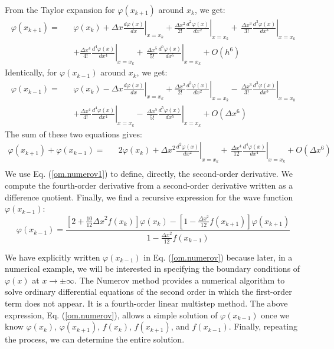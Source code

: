 \documentclass[nofootinbib, secnumarabic, amsmath, nobibnotes,11pt,aps,pra, floatfix]{revtex4-1}
\newcommand{\eref}[1]{Eq. (\ref{#1})}
\begin{document}
From the Taylor expansion for $\varphi(x_{k + 1})$ around $x_k$, we get:
\begin{eqnarray}
\varphi(x_{k + 1}) =&& \varphi(x_{k}) + \Delta x \left.\frac {d\varphi(x)}{dx}\right|_{x = x_k} + \frac{\Delta x^2}{2!} \left.\frac {d^2\varphi(x)}{dx^2}\right|_{x = x_k} +\, \left.\frac{\Delta x^3}{3!} \frac{d^3\varphi(x)}{dx^3}\right|_{x = x_k} \nonumber\\&&+ \frac{\Delta x^4}{4!} \left.\frac{d^4\varphi(x)}{dx^4}\right|_{x = x_k}+\, \frac{\Delta x^5}{5!} \left.\frac{d^5\varphi(x)}{dx^5}\right|_{x = x_k} + {O} (h^6)
\end{eqnarray}
Identically, for $\varphi(x_{k-1})$ around $x_k$, we get:
\begin{eqnarray}
\varphi(x_{k - 1}) =&& \varphi(x_{k}) - \Delta x \left.\frac {d\varphi(x)}{dx}\right|_{x = x_k} + \frac{\Delta x^2}{2!} \left. \frac {d^2\varphi(x)}{dx^2}\right|_{x = x_k}-\, \frac{\Delta x^3}{3!} \left.\frac{d^3\varphi(x)}{dx^3}\right|_{x = x_k}
 \nonumber\\ &&+ \frac{\Delta x^4}{4!} \left.\frac{d^4\varphi(x)}{dx^4}\right|_{x = x_k}-\, \frac{\Delta x^5}{5!} \left.\frac{d^5\varphi(x)}{dx^5}\right|_{x = x_k} + {O} (\Delta x^6)
\end{eqnarray}
The sum of these two equations gives:
\begin{eqnarray}
\varphi(x_{k + 1}) + \varphi(x_{k-1}) =&& 2\varphi(x_{k}) + {\Delta x^2} \left.\frac {d^2\varphi(x)}{dx^2}\right|_{x = x_k}+\, \frac{\Delta x^4}{12} \left.\frac {d^4\varphi(x)}{dx^4}\right|_{x = x_k} + {O} (\Delta x^6)\nonumber\\
\end{eqnarray}
We use \eref{om.numerov1} to define, directly, the second-order derivative. We compute the fourth-order derivative from a second-order derivative written as a difference  quotient. Finally, we find a recursive expression for the wave function $\varphi(x_{k-1})$:
\begin{equation}
\varphi(x_{k - 1}) = \frac{\left[2 + \frac{10}{12}{\Delta x}^{2}f(x_k) \right]\varphi(x_{k}) - \left[1 - \frac{{\Delta x}^{2}}{12}f(x_{k + 1}) \right]\varphi(x_{k + 1})}{1 - \frac{{\Delta x}^{2}}{12}f(x_{k - 1})}
\label{om.numerov}
\end{equation}

We have explicitly written $\varphi(x_{k - 1})$ in \eref{om.numerov}
because later, in a numerical example, we will be interested in
specifying the boundary conditions of $\varphi(x)$ at $x\rightarrow
\pm \infty$. The Numerov method \cite{om.numrov1,om.numrov2}
provides a numerical algorithm to solve ordinary differential
equations of the second order in which the first-order term does not
appear. It is a fourth-order linear multistep method. The above
expression, \eref{om.numerov}, allows a simple solution of
$\varphi(x_{k-1})$ once we know $\varphi(x_{k})$, $\varphi(x_{k +
1})$, $f(x_k)$, $f(x_{k + 1})$, and $f(x_{k-1})$. Finally, repeating
the process, we can determine the entire solution.
\end{document}
